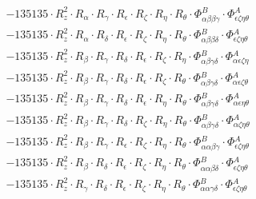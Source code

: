 \documentclass{article}
\begin{document}
\begin{subequations}
\begin{gather}
\begin{array}{c}
 \\[0.2em] 		 - 135135 \cdot R_{z}^{2} \cdot R_{\alpha{}} \cdot R_{\gamma{}} \cdot R_{\epsilon{}} \cdot R_{\zeta{}} \cdot R_{\eta{}} \cdot R_{\theta{}} \cdot \Phi{}^{B}_{\alpha{}\beta{}\beta{}\gamma{}} \cdot \Phi{}^{A}_{\epsilon{}\zeta{}\eta{}\theta{}} 
 \\[0.2em] 		 - 135135 \cdot R_{z}^{2} \cdot R_{\alpha{}} \cdot R_{\delta{}} \cdot R_{\epsilon{}} \cdot R_{\zeta{}} \cdot R_{\eta{}} \cdot R_{\theta{}} \cdot \Phi{}^{B}_{\alpha{}\beta{}\beta{}\delta{}} \cdot \Phi{}^{A}_{\epsilon{}\zeta{}\eta{}\theta{}} 
 \\[0.2em] 		 - 135135 \cdot R_{z}^{2} \cdot R_{\beta{}} \cdot R_{\gamma{}} \cdot R_{\delta{}} \cdot R_{\epsilon{}} \cdot R_{\zeta{}} \cdot R_{\eta{}} \cdot \Phi{}^{B}_{\alpha{}\beta{}\gamma{}\delta{}} \cdot \Phi{}^{A}_{\alpha{}\epsilon{}\zeta{}\eta{}} 
 \\[0.2em] 		 - 135135 \cdot R_{z}^{2} \cdot R_{\beta{}} \cdot R_{\gamma{}} \cdot R_{\delta{}} \cdot R_{\epsilon{}} \cdot R_{\zeta{}} \cdot R_{\theta{}} \cdot \Phi{}^{B}_{\alpha{}\beta{}\gamma{}\delta{}} \cdot \Phi{}^{A}_{\alpha{}\epsilon{}\zeta{}\theta{}} 
 \\[0.2em] 		 - 135135 \cdot R_{z}^{2} \cdot R_{\beta{}} \cdot R_{\gamma{}} \cdot R_{\delta{}} \cdot R_{\epsilon{}} \cdot R_{\eta{}} \cdot R_{\theta{}} \cdot \Phi{}^{B}_{\alpha{}\beta{}\gamma{}\delta{}} \cdot \Phi{}^{A}_{\alpha{}\epsilon{}\eta{}\theta{}} 
 \\[0.2em] 		 - 135135 \cdot R_{z}^{2} \cdot R_{\beta{}} \cdot R_{\gamma{}} \cdot R_{\delta{}} \cdot R_{\zeta{}} \cdot R_{\eta{}} \cdot R_{\theta{}} \cdot \Phi{}^{B}_{\alpha{}\beta{}\gamma{}\delta{}} \cdot \Phi{}^{A}_{\alpha{}\zeta{}\eta{}\theta{}} 
 \\[0.2em] 		 - 135135 \cdot R_{z}^{2} \cdot R_{\beta{}} \cdot R_{\gamma{}} \cdot R_{\epsilon{}} \cdot R_{\zeta{}} \cdot R_{\eta{}} \cdot R_{\theta{}} \cdot \Phi{}^{B}_{\alpha{}\alpha{}\beta{}\gamma{}} \cdot \Phi{}^{A}_{\epsilon{}\zeta{}\eta{}\theta{}} 
 \\[0.2em] 		 - 135135 \cdot R_{z}^{2} \cdot R_{\beta{}} \cdot R_{\delta{}} \cdot R_{\epsilon{}} \cdot R_{\zeta{}} \cdot R_{\eta{}} \cdot R_{\theta{}} \cdot \Phi{}^{B}_{\alpha{}\alpha{}\beta{}\delta{}} \cdot \Phi{}^{A}_{\epsilon{}\zeta{}\eta{}\theta{}} 
 \\[0.2em] 		 - 135135 \cdot R_{z}^{2} \cdot R_{\gamma{}} \cdot R_{\delta{}} \cdot R_{\epsilon{}} \cdot R_{\zeta{}} \cdot R_{\eta{}} \cdot R_{\theta{}} \cdot \Phi{}^{B}_{\alpha{}\alpha{}\gamma{}\delta{}} \cdot \Phi{}^{A}_{\epsilon{}\zeta{}\eta{}\theta{}} 

\end{array}
\end{gather}
\end{subequations}
\end{document}
